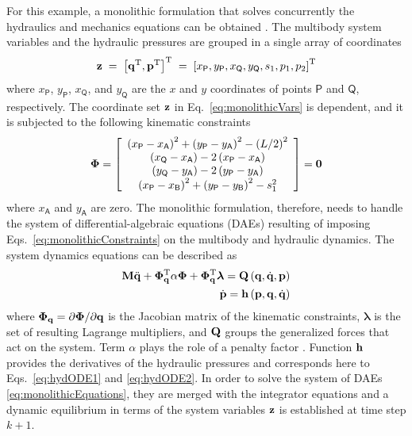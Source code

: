 \documentclass[fleqn,11pt]{article}
\newcommand{\point}[1]{ \mathsf{ #1 } }
\newcommand{\ptA}		{ {\point{A}}}
\newcommand{\ptB}		{ {\point{B}}}
\newcommand{\ptP}		{ {\point{P}}}
\newcommand{\ptQ}		{ {\point{Q}}}
\newcommand{\plbr}[1]{ \left( #1 \right) }
\newcommand{\sqbr}[1]{ \left[ #1 \right] }
\newcommand{\matr}[2]{ \sqbr{\begin{array}{ #1 } #2 \end{array} }}
\newcommand{\trans}		{ ^{\rm T} }
\newcommand{\zero}		{ {\bf 0} }
\newcommand{\pos}		{ {\bf{q}} }
\newcommand{\vel}		{ {{\dot{\bf{q}}}} }
\newcommand{\acc}		{ {\ddot{\bf{q}}} }
\newcommand{\Mass}		{ {\bf{M}} }
\newcommand{\ctr}		{ {\bm \Phi} }
\newcommand{\ctrJac}	{ {\bm \Phi}_{\pos} }
\newcommand{\fgen}		{ {\bf Q} }
\newcommand{\LagMult}	{ {\bm \lambda} }
\newcommand{\pres}		{ {\bf{p}} }
\newcommand{\presd}		{ {\dot{\bf{p}}} }
\begin{document}
For this example, a monolithic formulation that solves concurrently the hydraulics and mechanics equations can be obtained \cite{Naya2011}.
The multibody system variables and the hydraulic pressures are grouped in a single array of coordinates
\begin{equation}
	{\bf z} \;=\; \sqbr{\pos\trans,\pres\trans}\trans \;=\; \sqbr{x_{\ptP}, y_{\ptP}, x_{\ptQ}, y_{\ptQ}, s_1, p_1, p_2}\trans
	\label{eq:monolithicVars}
\end{equation}
where $x_{\ptP}$, $y_{\ptP}$, $x_{\ptQ}$, and $y_{\ptQ}$ are the $x$ and $y$ coordinates of points $\ptP$ and $\ptQ$, respectively. 
The coordinate set ${\bf z}$ in Eq.~\eqref{eq:monolithicVars} is dependent, and it is subjected to the following kinematic constraints
\begin{equation}
	\ctr = \matr{c}{
		\plbr{x_{\ptP} - x_{\ptA}}^2 + \plbr{y_{\ptP} - y_{\ptA}}^2 - \plbr{L/2}^2
		\\
		\plbr{x_{\ptQ} - x_{\ptA}} - 2 \plbr{x_{\ptP} - x_{\ptA}}
		\\
		\plbr{y_{\ptQ} - y_{\ptA}} - 2 \plbr{y_{\ptP} - y_{\ptA}}
		\\
		\plbr{x_{\ptP} - x_{\ptB}}^2 + \plbr{y_{\ptP} - y_{\ptB}}^2 - s_1^2
	} = \zero
	\label{eq:monolithicConstraints}
\end{equation}
where $x_{\point{A}}$ and $y_{\point{A}}$ are zero.
The monolithic formulation, therefore, needs to handle the system of differential-algebraic equations (DAEs) resulting of imposing Eqs.~\eqref{eq:monolithicConstraints} on the multibody and hydraulic dynamics.
The system dynamics equations can be described as
\begin{equation}
	\begin{split}
		\Mass \acc + \ctrJac\trans \alpha \ctr + \ctrJac\trans \LagMult = \fgen\plbr{\pos, \vel, \pres}
		\\
		\presd = {\bf h}\plbr{\pres, \pos, \vel}
	\end{split}
	\label{eq:monolithicEquations}
\end{equation} 
where $\ctrJac = \partial\ctr/\partial\pos$ is the Jacobian matrix of the kinematic constraints, $\LagMult$ is the set of resulting Lagrange multipliers, and $\fgen$ groups the generalized forces that act on the system.
Term $\alpha$ plays the role of a penalty factor \cite{Dopico2014}.
Function $\bf h$ provides the derivatives of the hydraulic pressures and corresponds here to Eqs.~\eqref{eq:hydODE1} and \eqref{eq:hydODE2}.
In order to solve the system of DAEs \eqref{eq:monolithicEquations}, they are merged with the integrator equations and a dynamic equilibrium in terms of the system variables ${\bf z}$ is established at time step $k+1$.
\end{document}

